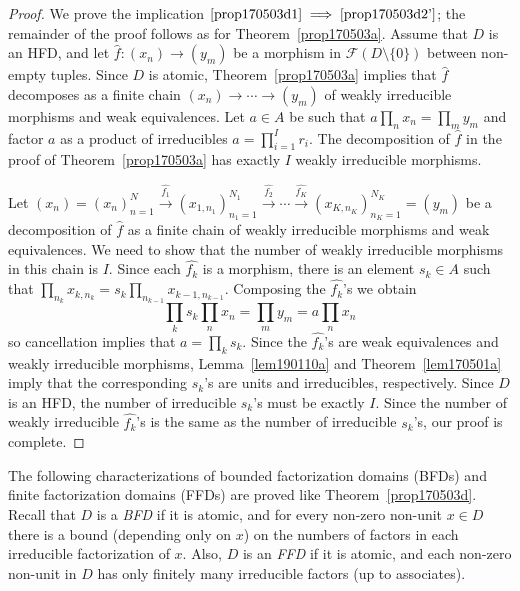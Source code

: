 \documentclass[reqno]{amsart}
\theoremstyle{plain}
\theoremstyle{definition}
\newcommand{\cat}[1]{\mathcal{#1}}
\newcommand{\catf}{\cat{F}}
\newcommand{\xra}{\xrightarrow}
\numberwithin{equation}{lem}
\begin{document}
\begin{proof}
We prove the implication $\eqref{prop170503d1}\implies\eqref{prop170503d2'}$;
the remainder of the proof follows as for 
Theorem~\ref{prop170503a}.
Assume that $D$ is an HFD, and let $\hat f\colon (x_n)\to(y_m)$ be a morphism in $\catf(D \setminus \{0\})$ between non-empty tuples.
Since $D$ is atomic, Theorem~\ref{prop170503a} implies that $\hat f$ 
decomposes as a finite chain
$(x_n)\to\cdots\to(y_m)$ of 
weakly
irreducible morphisms and weak equivalences.
Let $a\in A$ be such that $a\prod_nx_n=\prod_my_m$ and factor $a$ as a product of irreducibles $a=\prod_{i=1}^Ir_i$.
The decomposition of $\hat f$ in the proof of Theorem~\ref{prop170503a} has exactly $I$ 
weakly
irreducible morphisms.

Let 
$(x_n)=(x_n)_{n=1}^N\xra{\widehat{f_1}}(x_{1,n_1})_{n_1=1}^{N_1}\xra{\widehat{f_2}}\cdots\xra{\widehat{f_K}}(x_{K,n_K})_{n_K=1}^{N_K}=(y_m)$
be a decomposition of $\hat f$ as a finite chain of 
weakly
irreducible morphisms and weak equivalences.
We need to show that the number of 
weakly
irreducible morphisms in this chain is $I$.
Since each $\widehat{f_k}$ is a morphism, there is an element $s_k\in A$ such that
$\prod_{n_k}x_{k,n_k}=s_k\prod_{n_{k-1}}x_{k-1,n_{k-1}}$.
Composing the $\widehat{f_k}$'s we obtain
$$
\textstyle\prod_ks_k\prod_nx_n=
\prod_my_m=a\prod_nx_n$$
so cancellation implies that $a=\prod_ks_k$.
Since the $\widehat{f_k}$'s are   weak equivalences and 
weakly
irreducible morphisms,
Lemma~\ref{lem190110a} and Theorem~\ref{lem170501a}
imply that the 
corresponding $s_k$'s are units and irreducibles, respectively.
Since $D$ is an HFD, the number of irreducible $s_k$'s must be exactly $I$.
Since the number of 
weakly
irreducible $\widehat{f_k}$'s is the same as the number of irreducible $s_k$'s, our proof is complete.
\end{proof}

The following characterizations of 
bounded factorization domains (BFDs)
and finite factorization domains (FFDs)
are proved like 
Theorem~\ref{prop170503d}.
Recall that  $D$ is a \emph{BFD} if it is atomic, and for every non-zero non-unit $x\in D$
there is a bound (depending only on $x$) on the numbers of factors in each irreducible factorization of $x$.
Also, $D$ is an \emph{FFD} if it is atomic, and each non-zero non-unit in $D$ has only finitely many irreducible factors
(up to associates).
\end{document}
